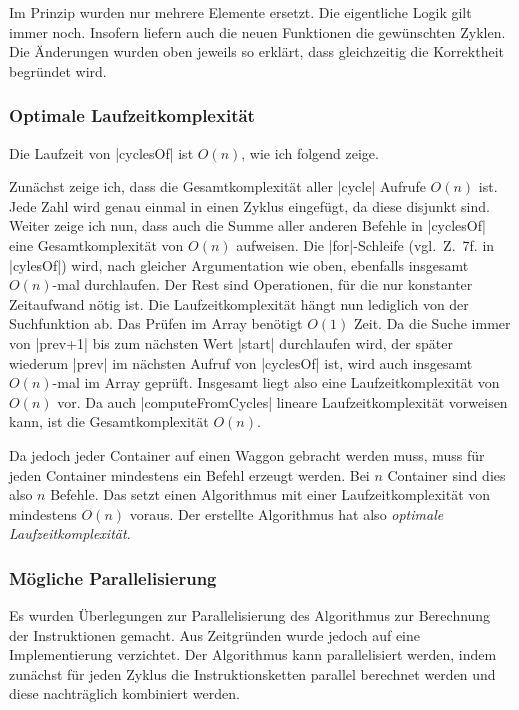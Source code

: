 Im Prinzip wurden nur mehrere Elemente ersetzt. Die eigentliche Logik gilt immer noch. Insofern liefern auch die neuen Funktionen die gewünschten Zyklen.
Die Änderungen wurden oben jeweils so erklärt, dass gleichzeitig die Korrektheit begründet wird.

\subsubsection{Optimale Laufzeitkomplexität}
Die Laufzeit von |cyclesOf| ist $O(n)$, wie ich folgend zeige.

Zunächst zeige ich, dass die Gesamtkomplexität aller |cycle| Aufrufe $O(n)$ ist.
Jede Zahl wird genau einmal in einen Zyklus eingefügt, da diese disjunkt sind.
Weiter zeige ich nun, dass auch die Summe aller anderen Befehle in |cyclesOf| eine Gesamtkomplexität von $O(n)$ aufweisen.
Die |for|-Schleife (vgl.\ Z.\ 7f. in |cylesOf|) wird, nach gleicher Argumentation wie oben, ebenfalls insgesamt $O(n)$-mal durchlaufen.
Der Rest sind Operationen, für die nur konstanter Zeitaufwand nötig ist. Die Laufzeitkomplexität hängt nun lediglich von der Suchfunktion ab.
Das Prüfen im Array benötigt $O(1)$ Zeit. Da die Suche immer von |prev+1| bis zum nächsten Wert |start| durchlaufen wird, der später wiederum |prev| im nächsten Aufruf von |cyclesOf| ist,
wird auch insgesamt $O(n)$-mal im Array geprüft. Insgesamt liegt also eine Laufzeitkomplexität von $O(n)$ vor.
Da auch |computeFromCycles| lineare Laufzeitkomplexität vorweisen kann, ist die Gesamtkomplexität $O(n)$.

Da jedoch jeder Container auf einen Waggon gebracht werden muss, muss für jeden Container mindestens ein Befehl erzeugt werden.
Bei $n$ Container sind dies also $n$ Befehle. Das setzt einen Algorithmus mit einer Laufzeitkomplexität von mindestens $O(n)$ voraus.
Der erstellte Algorithmus hat also \emph{optimale Laufzeitkomplexität}.

\subsubsection{Mögliche Parallelisierung}
Es wurden Überlegungen zur Parallelisierung des Algorithmus zur Berechnung der Instruktionen gemacht.
Aus Zeitgründen wurde jedoch auf eine Implementierung verzichtet.
Der Algorithmus kann pa\-ral\-le\-li\-siert werden,
indem zunächst für jeden Zyklus die Instruktionsketten parallel berechnet werden und diese nachträglich kombiniert werden.
\clearpage

